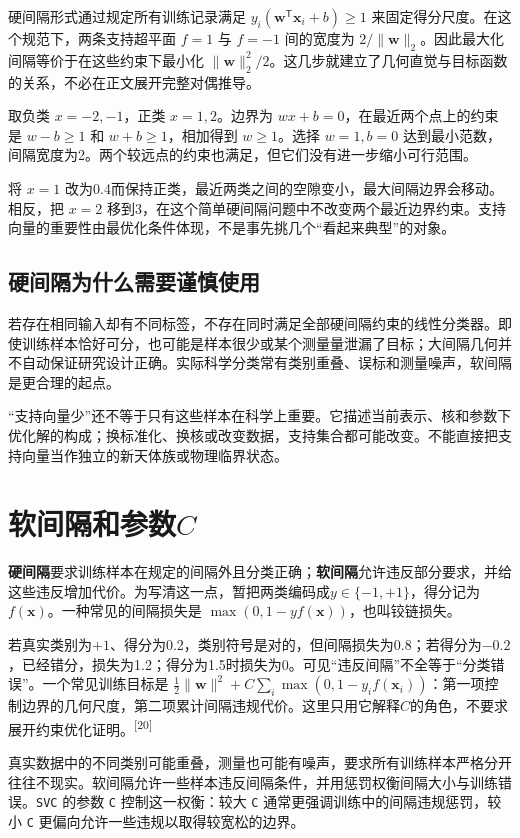 硬间隔形式通过规定所有训练记录满足 $y_i(\mathbf w^\mathsf T\mathbf x_i+b)\geq1$ 来固定得分尺度。在这个规范下，两条支持超平面 $f=1$ 与 $f=-1$ 间的宽度为 $2/\|\mathbf w\|_2$。因此最大化间隔等价于在这些约束下最小化 $\|\mathbf w\|_2^2/2$。这几步就建立了几何直觉与目标函数的关系，不必在正文展开完整对偶推导。

取负类 $x=-2,-1$，正类 $x=1,2$。边界为 $wx+b=0$，在最近两个点上的约束是 $w-b\geq1$ 和 $w+b\geq1$，相加得到 $w\geq1$。选择 $w=1,b=0$ 达到最小范数，间隔宽度为2。两个较远点的约束也满足，但它们没有进一步缩小可行范围。

将 $x=1$ 改为0.4而保持正类，最近两类之间的空隙变小，最大间隔边界会移动。相反，把 $x=2$ 移到3，在这个简单硬间隔问题中不改变两个最近边界约束。支持向量的重要性由最优化条件体现，不是事先挑几个“看起来典型”的对象。

\subsection{硬间隔为什么需要谨慎使用}
若存在相同输入却有不同标签，不存在同时满足全部硬间隔约束的线性分类器。即使训练样本恰好可分，也可能是样本很少或某个测量量泄漏了目标；大间隔几何并不自动保证研究设计正确。实际科学分类常有类别重叠、误标和测量噪声，软间隔是更合理的起点。

“支持向量少”还不等于只有这些样本在科学上重要。它描述当前表示、核和参数下优化解的构成；换标准化、换核或改变数据，支持集合都可能改变。不能直接把支持向量当作独立的新天体族或物理临界状态。

\section{软间隔和参数\texorpdfstring{$C$}{C}}

\textbf{硬间隔}要求训练样本在规定的间隔外且分类正确；\textbf{软间隔}允许违反部分要求，并给这些违反增加代价。为写清这一点，暂把两类编码成$y\in\{-1,+1\}$，得分记为$f(\mathbf x)$。一种常见的间隔损失是 $\max(0,1-yf(\mathbf x))$，也叫铰链损失。

若真实类别为$+1$、得分为0.2，类别符号是对的，但间隔损失为0.8；若得分为$-0.2$，已经错分，损失为1.2；得分为1.5时损失为0。可见“违反间隔”不全等于“分类错误”。一个常见训练目标是 $\tfrac12\|\mathbf w\|^2+C\sum_i\max(0,1-y_if(\mathbf x_i))$：第一项控制边界的几何尺度，第二项累计间隔违规代价。这里只用它解释$C$的角色，不要求展开约束优化证明。\textsuperscript{[20]}

真实数据中的不同类别可能重叠，测量也可能有噪声，要求所有训练样本严格分开往往不现实。软间隔允许一些样本违反间隔条件，并用惩罚权衡间隔大小与训练错误。\texttt{SVC} 的参数 \texttt{C} 控制这一权衡：较大 \texttt{C} 通常更强调训练中的间隔违规惩罚，较小 \texttt{C} 更偏向允许一些违规以取得较宽松的边界。

